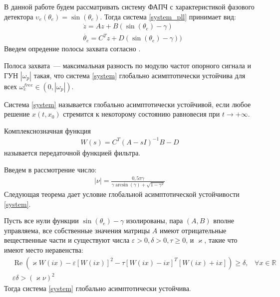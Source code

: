 \documentclass[a4paper,article,14pt]{extarticle}
\begin{document}
В данной работе будем рассматривать систему ФАПЧ с характеристикой фазового детектора $\upsilon_e(\theta_e) = \operatorname{sin}(\theta_e)$. Тогда система \eqref{system_pll} принимает вид:
 \begin{equation}\label{system}
 \begin{aligned}
 &\dot{z} = Az + B(\operatorname{sin}(\theta_e) - \gamma)\\
 &\dot{\theta_e} = C^Tz + D(\operatorname{sin}(\theta_e) - \gamma))
 \end{aligned}
\end{equation}
Введем опредение полосы захвата согласно \cite{kuznetsov_article}.
\begin{definition}
Полоса захвата~--- максимальная разность по модулю частот опорного сигнала и ГУН $|\omega_p|$ такая, что система \eqref{system} глобально асимптотически устойчива для всех $\omega_e^{free} \in (0, |\omega_p|)$.
\end{definition}

\begin{definition}
Система \eqref{system} называется глобально асимптотически устойчивой, если любое решение $x(t, x_0)$  стремится к некоторому состоянию равновесия при $t \rightarrow +\infty$.
\end{definition}

\begin{definition}
Комплекснозначная функция  
\begin{equation}
 \begin{aligned}
 W(s)=C^T \left(A-sI\right)^{-1}B - D
 \end{aligned}
\end{equation}
называется передаточной функцией фильтра.
\end{definition}

Введем в рассмотрение число:
 \begin{equation}
 \begin{aligned}
\mid\nu\mid = \frac{0,5\pi\gamma}{\gamma \operatorname{arcsin} (\gamma) + \sqrt{1-\gamma^2}}
 \end{aligned}
\end{equation}
Следующая теорема дает условие глобальной асимптотической устойчивости \eqref{system}.
\begin{theorem}\label{th1}
Пусть все нули функции $\operatorname{sin}(\theta_e) - \gamma$ изолированы, пара $(A, B)$ вполне управляема, все собственные значения матрицы $A$ имеют отрицательные вещественные части и существуют числа $\varepsilon > 0, \delta > 0, \tau \geqslant 0$, и $\varkappa$, такие что имеют место неравенства:
 \begin{align}
&\operatorname{Re}\left( \varkappa W(ix)- \varepsilon\left[W(ix)\right]^2-\tau\left[ W(ix)-ix \right]^T\left[W(ix)+ix \right]\right) \geqslant \delta \text{,} \quad
\forall x \in \mathbb{R} \label{first_th_eq}\\
&\varepsilon\delta > (\varkappa\nu)^2\label{second_th_eq}
 \end{align}
 Тогда система \eqref{system} глобально асимптотически устойчива.
\end{theorem}
\end{document}
